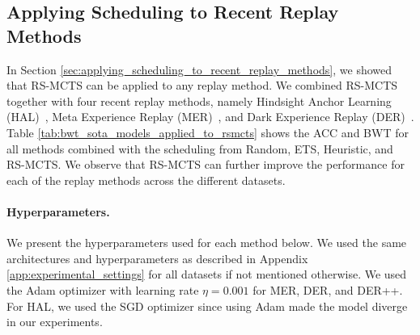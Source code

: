 \subsection{Applying Scheduling to Recent Replay Methods}
\label{app:apply_scheduling_to_recent_replay_methods}

In Section \ref{sec:applying_scheduling_to_recent_replay_methods}, we showed that RS-MCTS can be applied to any replay method. We combined RS-MCTS together with four recent replay methods, namely Hindsight Anchor Learning (HAL)~, Meta Experience Replay (MER)~, and Dark Experience Replay (DER)~. Table \ref{tab:bwt_sota_models_applied_to_rsmcts} shows the ACC and BWT for all methods combined with the scheduling from Random, ETS, Heuristic, and RS-MCTS. We observe that RS-MCTS can further improve the performance for each of the replay methods across the different datasets.  

\paragraph{Hyperparameters.} We present the hyperparameters used for each method below. We used the same architectures and hyperparameters as described in Appendix \ref{app:experimental_settings} for all datasets if not mentioned otherwise. We used the Adam optimizer with learning rate $\eta=0.001$ for MER, DER, and DER++. For HAL, we used the SGD optimizer since using Adam made the model diverge in our experiments.  

